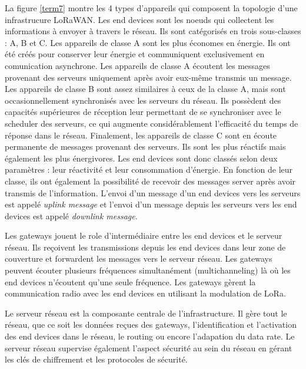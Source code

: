 La figure \ref{term7} montre les 4 types d'appareils qui composent la topologie d'une infrastrucure LoRaWAN.
Les end devices sont les noeuds qui collectent les informations à envoyer à travers le réseau. Ils sont catégorisés en trois sous-classes : A, B et C. Les appareils de classe A sont les plus économes en énergie. Ils ont été créés pour conserver leur énergie et communiquent exclusivement en comunication asynchrone. Les appareils de classe A écoutent les messages provenant des serveurs uniquement après avoir eux-même transmis un message. Les appareils de classe B sont assez similaires à ceux de la classe A, mais sont occasionnellement synchronisés avec les serveurs du réseau. Ils possèdent des capacités supérieures de réception leur permettant de se synchroniser avec le scheduler des serveurs, ce qui augmente considérablement l'efficacité du temps de réponse dans le réseau. Finalement, les appareils de classe C sont en écoute permanente de messages provenant des serveurs. Ils sont les plus réactifs mais également les plus énergivores. Les end devices sont donc classés selon deux paramètres : leur réactivité et leur consommation d'énergie. En fonction de leur classe, ils ont également la possibilité de recevoir des messages server après avoir transmis de l'information. L'envoi d'un message d'un end devices vers les serveurs est appelé \textit{uplink message} et l'envoi d'un message depuis les serveurs vers les end devices est appelé \textit{downlink message}.

\vspace{0.1cm}

Les gateways jouent le role d'intermédiaire entre les end devices et le serveur réseau. Ils reçoivent les transmissions depuis les end devices dans leur zone de couverture
et forwardent les messages vers le serveur réseau. Les gateways peuvent écouter plusieurs fréquences simultanément (multichanneling) là où les end devices n'écoutent qu'une seule fréquence. Les gateways gèrent la communication radio avec les end devices en utilisant la modulation de \ac{LoRa}.

\vspace{0.1cm}

Le serveur réseau est la composante centrale de l'infrastructure. Il gère tout le réseau, que ce soit les données reçues des gateways, l'identification et l'activation des end devices dans le réseau, le routing ou encore l'adapation du data rate. Le serveur réseau supervise également l'aspect sécurité au sein du réseau en gérant les clés de chiffrement et les protocoles de sécurité.

